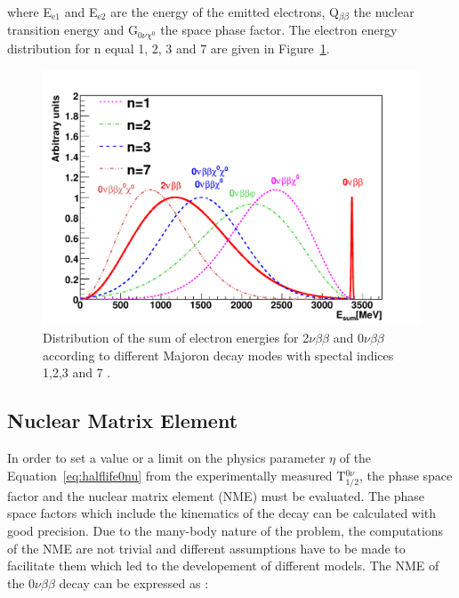 \documentclass[main.tex]{subfiles}
\begin{document}
\NI where E$_{\text{e1}}$ and E$_{\text{e2}}$ are the energy of the emitted electrons, Q$_{\beta\beta}$ the nuclear transition energy and G$_{\text{0}\nu\chi^\text{0}}$ the space phase factor. The electron energy distribution for n equal 1, 2, 3 and 7 are given in Figure~\ref{DifferentbbDecaySpectrum}.


\bigskip


\begin{figure}[h!]
\begin{center}
\includegraphics[scale=0.5]{pictures/Chap2/esum_theory.pdf}
\caption{Distribution of the sum of electron energies for 2$\nu\beta\beta$ and 0$\nu\beta\beta$ according to different Majoron decay modes with spectal indices 1,2,3 and 7 \cite{FatemiGhomiThesis}.}
\label{DifferentbbDecaySpectrum}
\end{center}
\end{figure}


\FloatBarrier


\subsection{Nuclear Matrix Element}\label{sec:NME}


\NI In order to set a value or a limit on the physics parameter $\eta$ of the Equation~\ref{eq:halflife0nu} from the experimentally measured T$_{\text{1/2}}^{\text{0}\nu}$, the phase space factor and the nuclear matrix element (NME) must be evaluated. The phase space factors which include the kinematics of the decay can be calculated with good precision. Due to the many-body nature of the problem, the computations of the NME are not trivial and different assumptions have to be made to facilitate them which led to the developement of different models.  The NME of the 0$\nu\beta\beta$ decay can be expressed as :
\end{document}
